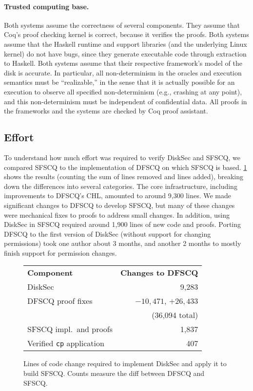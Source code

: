 \paragraph{Trusted computing base.}

Both systems assume the correctness of several components.  They assume
that Coq's proof checking kernel is correct, because it verifies
the proofs. Both systems assume that the Haskell runtime and support
libraries (and the underlying Linux kernel) do not have bugs, since
they generate executable code through extraction to Haskell. Both systems
assume that their respective framework's model of the disk is accurate.  In particular, all
non-determinism in the oracles and execution semantics must be ``realizable,''
in the sense that it is actually possible for an execution to observe
all specified non-determinism (e.g., crashing at any point), and this
non-determinism must be independent of confidential data.  All proofs in the frameworks and the systems are checked by Coq proof assistant.


\subsection{Effort}


To understand how much effort was required to verify DiskSec and SFSCQ, we
compared SFSCQ to the implementation of DFSCQ on which SFSCQ is based.
\ref{fig:loc} shows the results (counting the sum of lines removed and lines
added), breaking down the differences into several categories.  The core
infrastructure, including improvements to DFSCQ's CHL, amounted to around
9,300 lines.  We made significant changes to DFSCQ to develop SFSCQ, but many
of these changes were mechanical fixes to proofs to address small changes. In
addition, using DiskSec in SFSCQ required around 1,900 lines of new code and proofs.
Porting DFSCQ to the first version of DiskSec (without support for changing
permissions) took one author about 3 months, and another 2 months to
mostly finish support for permission changes.

\begin{figure}[ht]
  \centering
  \begin{tabular}{lr}
    \textbf{Component} & \textbf{Changes to DFSCQ} \\
    DiskSec & 9,283 \\
    DFSCQ proof fixes & $-10,471$, $+26,433$ \\
    & \quad (36,094 total) \\
    SFSCQ impl.\ and proofs & 1,837 \\
    Verified \texttt{cp} application & 407 \\
  \end{tabular}
  \caption{Lines of code change required to implement DiskSec and apply it to build
    SFSCQ. Counts measure the diff between DFSCQ and SFSCQ.}
  \label{fig:loc}
\end{figure}



